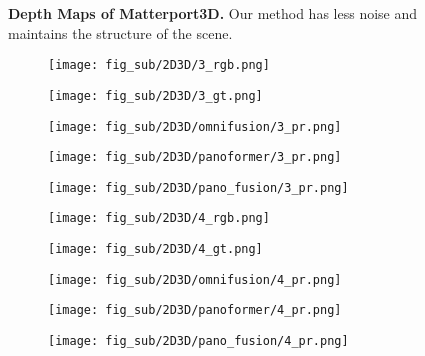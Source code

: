 \begin{figure*}[t]
	
	\caption{
		\textbf{Depth Maps of Matterport3D.} Our method has less noise and maintains the structure of the scene.
	}
	\label{fig:mat3d_cloud}
    \vspace{-1.0em}
\end{figure*}




\begin{figure*}[t]
	\centering
	\captionsetup[subfigure]{labelformat=empty}
	
	\begin{subfigure}{0.18\linewidth}
		\texttt{[image: fig\_sub/2D3D/3\_rgb.png]}
	\end{subfigure}
	\begin{subfigure}{0.18\linewidth}
		\texttt{[image: fig\_sub/2D3D/3\_gt.png]}
	\end{subfigure}
	\begin{subfigure}{0.18\linewidth}
		\texttt{[image: fig\_sub/2D3D/omnifusion/3\_pr.png]}
	\end{subfigure}
	\begin{subfigure}{0.18\linewidth}
		\texttt{[image: fig\_sub/2D3D/panoformer/3\_pr.png]}
	\end{subfigure}
	\begin{subfigure}{0.18\linewidth}
		\texttt{[image: fig\_sub/2D3D/pano\_fusion/3\_pr.png]}
	\end{subfigure}
	
	\vspace{1pt}
	
	
	\begin{subfigure}{0.18\linewidth}
		\texttt{[image: fig\_sub/2D3D/4\_rgb.png]}
	\end{subfigure}
	\begin{subfigure}{0.18\linewidth}
		\texttt{[image: fig\_sub/2D3D/4\_gt.png]}
	\end{subfigure}
	\begin{subfigure}{0.18\linewidth}
		\texttt{[image: fig\_sub/2D3D/omnifusion/4\_pr.png]}
	\end{subfigure}
	\begin{subfigure}{0.18\linewidth}
		\texttt{[image: fig\_sub/2D3D/panoformer/4\_pr.png]}
	\end{subfigure}
	\begin{subfigure}{0.18\linewidth}
		\texttt{[image: fig\_sub/2D3D/pano\_fusion/4\_pr.png]}
	\end{subfigure}
	

\end{figure*}

